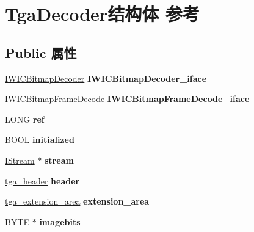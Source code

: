\hypertarget{struct_tga_decoder}{}\section{Tga\+Decoder结构体 参考}
\label{struct_tga_decoder}
\subsection*{Public 属性}
\begin{DoxyCompactItemize}
\item 
\mbox{\label{struct_tga_decoder_a8f65b035f09207cac4e3a6949b1da907}} 
\hyperlink{interface_i_w_i_c_bitmap_decoder}{I\+W\+I\+C\+Bitmap\+Decoder} {\bfseries I\+W\+I\+C\+Bitmap\+Decoder\+\_\+iface}
\item 
\mbox{\label{struct_tga_decoder_a29213bee2d3c0e28b1b1bda8f131cb52}} 
\hyperlink{interface_i_w_i_c_bitmap_frame_decode}{I\+W\+I\+C\+Bitmap\+Frame\+Decode} {\bfseries I\+W\+I\+C\+Bitmap\+Frame\+Decode\+\_\+iface}
\item 
\mbox{\label{struct_tga_decoder_aa51f61450eb6d74762d8369c899e1bcf}} 
L\+O\+NG {\bfseries ref}
\item 
\mbox{\label{struct_tga_decoder_a4201761868376b0a4469ee069c75124f}} 
B\+O\+OL {\bfseries initialized}
\item 
\mbox{\label{struct_tga_decoder_a1750016dd892f8ccdf4b2d5f58eb5d24}} 
\hyperlink{interface_i_stream}{I\+Stream} $\ast$ {\bfseries stream}
\item 
\mbox{\label{struct_tga_decoder_a0a8e28b0dbe01886b4bd7b1863727810}} 
\hyperlink{structtga__header}{tga\+\_\+header} {\bfseries header}
\item 
\mbox{\label{struct_tga_decoder_a12ff89eb0b2235f1e5187ec6fd141ff9}} 
\hyperlink{structtga__extension__area}{tga\+\_\+extension\+\_\+area} {\bfseries extension\+\_\+area}
\item 
\mbox{\label{struct_tga_decoder_acd7336deaac8f3c30bbb36b584b70d79}} 
B\+Y\+TE $\ast$ {\bfseries imagebits}
\item 

\end{DoxyCompactItemize}
